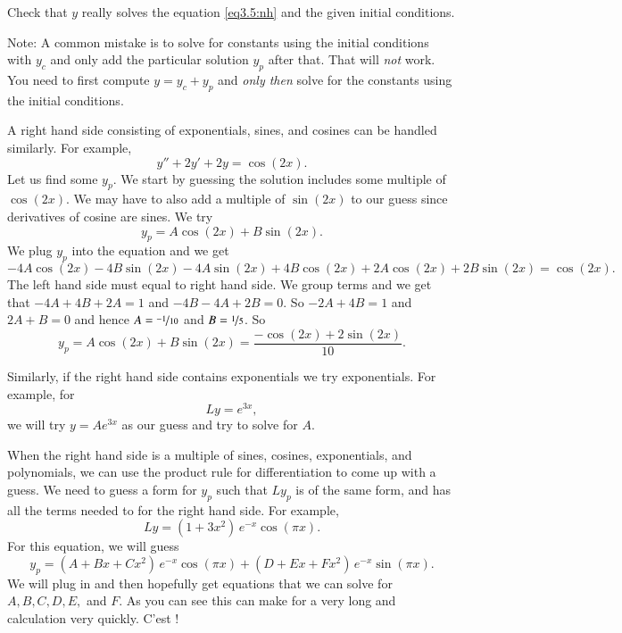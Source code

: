 \begin{exercise}
Check that $y$ really solves the equation \eqref{eq3.5:nh}
and the given initial conditions.
\end{exercise}

Note: A common mistake is to solve for constants using the initial
conditions with $y_c$ and only add the particular solution $y_p$ after that.
That will \emph{not} work.  You need to first compute $y = y_c + y_p$ and
\emph{only then} solve for the constants using the initial conditions.

\medskip

A right hand side consisting of exponentials, sines, and cosines
can be handled similarly.  For example,
\begin{equation*}
y''+2y'+2y = \cos (2x) .
\end{equation*}
Let us find some $y_p$.  We start by guessing the solution
includes some multiple of $\cos(2x)$.
We may have to also
add a multiple of $\sin (2x)$ to our guess since derivatives of cosine are
sines.  We try
\begin{equation*}
y_p = A \cos (2x) + B \sin (2x) .
\end{equation*}
We plug $y_p$ into the equation and we get
\begin{equation*}
-4 A \cos (2x) - 4 B \sin (2x) 
-4A \sin (2x) + 4B \cos (2x)
+ 2A \cos (2x) + 2B \sin (2x)
= \cos (2x) .
\end{equation*}
The left hand side must equal to right hand side.  We group terms and
we get that $-4A + 4B + 2A = 1$ and
$-4B - 4A + 2B = 0$.  So $-2A+4B =1$ and $2A+B=0$ and hence
$A=\nicefrac{-1}{10}$ and $B=\nicefrac{1}{5}$.  So
\begin{equation*}
y_p = A \cos (2x) + B \sin (2x) = \frac{-\cos (2x) + 2 \sin (2x)}{10} .
\end{equation*}

Similarly, if the right hand side contains exponentials we try
exponentials.  For example, for
\begin{equation*}
Ly = e^{3x},
\end{equation*}
we will try $y = A e^{3x}$ as our guess and try to solve for $A$.

\medskip

When the right hand side is a multiple of sines, cosines, exponentials,
and polynomials, we can use the product rule
for differentiation to come up with a guess.  We
need to guess a
form for $y_p$ such that $Ly_p$ is of the same form, and 
has all the terms needed to for 
the right hand side.
For example,
\begin{equation*}
Ly = (1+3x^2)\,e^{-x}\cos (\pi x) .
\end{equation*}
For this equation, we will guess
\begin{equation*}
y_p = (A + Bx + Cx^2)\,e^{-x} \cos (\pi x) + 
(D + Ex + Fx^2)\,e^{-x} \sin (\pi x) .
\end{equation*}
We will plug in and then hopefully get equations that we can solve for
$A,B,C,D,E,$ and $F$.  As you can see this can make for a very long and
calculation very quickly.  C'est ! %

